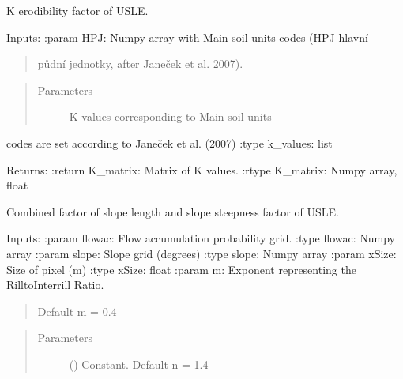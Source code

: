 \documentclass[letterpaper,10pt,english]{sphinxmanual}
\begin{document}
\begin{fulllineitems}

\begin{fulllineitems}
\label{\detokenize{libs:usle.RadUSLE.fK}}
K erodibility factor of USLE.

Inputs:
:param HPJ: Numpy array with Main soil units codes (HPJ \sphinxhyphen{} hlavní
\begin{quote}

půdní jednotky, after Janeček et al. 2007).
\end{quote}
\begin{quote}\begin{description}
\item[{Parameters}] \leavevmode
{} \textendash{} K values corresponding to Main soil units

\end{description}\end{quote}

codes are set according to Janeček et al. (2007)
:type k\_values: list

Returns:
:return K\_matrix: Matrix of K values.
:rtype K\_matrix: Numpy array, float

\end{fulllineitems}


\begin{fulllineitems}
\label{\detokenize{libs:usle.RadUSLE.fLS}}
Combined factor of slope length and slope steepness factor
of USLE.

Inputs:
:param flowac: Flow accumulation probability grid.
:type flowac: Numpy array
:param slope: Slope grid (degrees)
:type slope: Numpy array
:param xSize: Size of pixel (m)
:type xSize: float
:param m: Exponent representing the Rill\sphinxhyphen{}to\sphinxhyphen{}Interrill Ratio.
\begin{quote}

Default m = 0.4
\end{quote}
\begin{quote}\begin{description}
\item[{Parameters}] \leavevmode
{} () \textendash{} Constant. Default n = 1.4


\end{description}
\end{quote}
\end{fulllineitems}
\end{fulllineitems}
\end{document}
